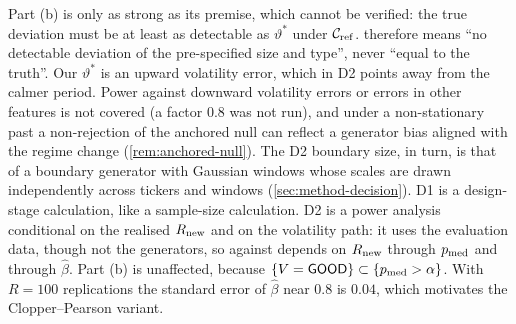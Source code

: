 Part (b) is only as strong as its premise, which cannot be verified: the true deviation must be at
least as detectable as $\vartheta^*$ under $\mathcal{C}_{\mathrm{ref}}$. \GOOD{} therefore means ``no detectable
deviation of the pre-specified size and type'', never ``equal to the truth''. Our $\vartheta^*$ is
an upward volatility error, which in D2 points away from the calmer \TEST{} period. Power against
downward volatility errors or errors in other features is not covered (a factor 0.8 was not
run), and under a non-stationary past a non-rejection of the anchored null can reflect a generator
bias aligned with the regime change (\cref{rem:anchored-null}). The D2 boundary size, in turn,
is that of a boundary generator with Gaussian windows whose scales are drawn independently across
tickers and windows (\cref{sec:method-decision}). D1 is a design-stage
calculation, like a sample-size calculation. D2 is a power analysis conditional on the realised
$R_{\mathrm{new}}$ and on the \TRAIN{} volatility path: it uses the evaluation data, though not the generators,
so \GOOD{} against \INCONCL{} depends on $R_{\mathrm{new}}$ through $p_{\mathrm{med}}$ and through $\hat\beta$. Part (b)
is unaffected, because $\{V=\textsf{GOOD}\}\subset\{p_{\mathrm{med}}>\alpha\}$. With $R=100$ replications the standard
error of $\hat\beta$ near $0.8$ is $0.04$, which motivates the Clopper--Pearson variant.

